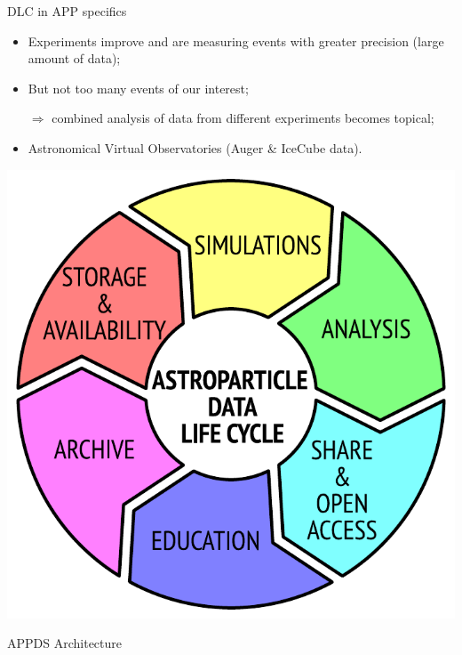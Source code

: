 \begin{frame}{DLC in APP specifics}
\begin{minipage}[c]{0.64\textwidth}
  \begin{itemize}
    \item Experiments improve and are measuring events with greater precision (large amount of data);
    \item But not too many events of our interest;
    \item[$\Rightarrow$] combined analysis of data from different experiments becomes topical;
    \item Astronomical Virtual Observatories (Auger \& IceCube data).
  \end{itemize}
\end{minipage}
\hfill
\begin{minipage}[c]{0.35\textwidth}
  \includegraphics[width=1\textwidth]{pics/ADLC.pdf}
\end{minipage}
\end{frame}

\begin{frame}{APPDS Architecture}

\end{frame}



